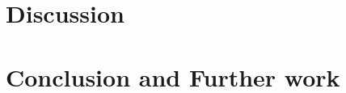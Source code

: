 \documentclass[conference,twocolumn,letterpaper,10pt]{latex/IEEEtran}
\begin{document}

\maketitle

\begin{abstract}
%
  
\end{abstract}

\begin{IEEEkeywords}
\end{IEEEkeywords}

\linenumbers

%



\section{Discussion}\label{sec:discussion}
\section{Conclusion and Further work}\label{sec:conclusion}
\nolinenumbers
\end{document}

